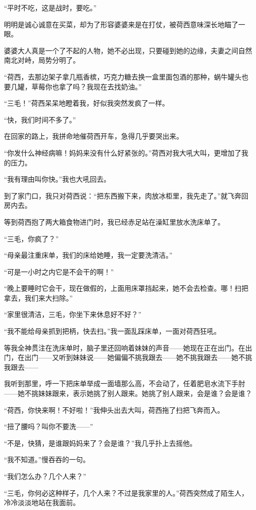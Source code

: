 \par “平时不吃，这是战时，要吃。”
\par 明明是诚心诚意在买菜，却为了形容婆婆来是在打仗，被荷西意味深长地瞄了一眼。
\par 婆婆大人真是一个了不起的人物，她不必出现，只要碰到她的边缘，夫妻之间自然南北对峙，局势分明了。
\par “荷西，去那边架子拿几瓶香槟，巧克力糖去换一盒里面包酒的那种，蜗牛罐头也要几罐，草莓你也拿了吗？我现在去找奶油。”
\par “三毛！”荷西呆呆地瞪着我，好似我突然发疯了一样。
\par “快，我们时间不多了。”
\par 在回家的路上，我拼命地催荷西开车，急得几乎要哭出来。
\par “你发什么神经病嘛！妈妈来没有什么好紧张的。”荷西对我大吼大叫，更增加了我的压力。
\par “我有理由叫你快。”我也大吼回去。
\par 到了家门口，我只对荷西说：“把东西搬下来，肉放冰柜里，我先走了。”就飞奔回房内去。
\par 等到荷西抱了两大箱食物进门时，我已经赤足站在澡缸里放水洗床单了。
\par “三毛，你疯了？”
\par “母亲最注重床单，我们的床给她睡，我一定要洗清洁。”
\par “可是一小时之内它是不会干的啊！”
\par “晚上要睡时它会干，现在做假的，上面用床罩挡起来，她不会去检查。哪！扫把拿去，我们来大扫除。”
\par “家里很清洁，三毛，你坐下来休息好不好？”
\par “我不能给母亲抓到把柄，快去扫。”我一面乱踩床单，一面对荷西狂吼。
\par 等我全神贯注在洗床单时，脑子里还回响着妹妹的声音——她现在正在出门。在出门，在出门——又听到妹妹说——她偏偏不挑我跟去——她不挑我跟去——她不挑我跟去——
\par 我听到那里，呼一下把床单举成一面墙那么高，不会动了，任着肥皂水流下手肘——她不挑妹妹跟来，表示她挑了别人跟来。她挑了别人跟来，会是谁？会是谁？
\par “荷西，你快来啊！不好啦！”我伸头出去大叫，荷西拖了扫把飞奔而入。
\par “扭了腰吗？叫你不要洗——”
\par “不是，快猜，是谁跟妈妈来了？会是谁？”我几乎扑上去摇他。
\par “我不知道。”慢吞吞的一句。
\par “我们怎么办？几个人来？”
\par “三毛，你何必这种样子，几个人来？不过是我家里的人。”荷西突然成了陌生人，冷冷淡淡地站在我面前。
